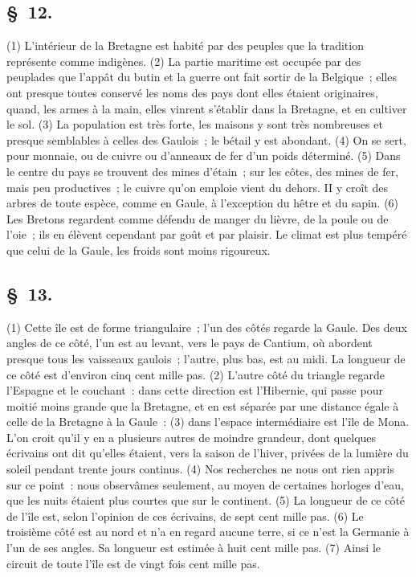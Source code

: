 \documentclass[french,twoside]{book} %
\begin{document}
\subsection[{§ 12.}]{ \textsc{§ 12.} }
\noindent (1) L'intérieur de la Bretagne est habité par des peuples que la tradition représente comme indigènes. (2) La partie maritime est occupée par des peuplades que l’appât du butin et la guerre ont fait sortir de la Belgique ; elles ont presque toutes conservé les noms des pays dont elles étaient originaires, quand, les armes à la main, elles vinrent s’établir dans la Bretagne, et en cultiver le sol. (3) La population est très forte, les maisons y sont très nombreuses et presque semblables à celles des Gaulois ; le bétail y est abondant. (4) On se sert, pour monnaie, ou de cuivre ou d’anneaux de fer d’un poids déterminé. (5) Dans le centre du pays se trouvent des mines d’étain ; sur les côtes, des mines de fer, mais peu productives ; le cuivre qu’on emploie vient du dehors. II y croît des arbres de toute espèce, comme en Gaule, à l’exception du hêtre et du sapin. (6) Les Bretons regardent comme défendu de manger du lièvre, de la poule ou de l’oie ; ils en élèvent cependant par goût et par plaisir. Le climat est plus tempéré que celui de la Gaule, les froids sont moins rigoureux.
\subsection[{§ 13.}]{ \textsc{§ 13.} }
\noindent (1) Cette île est de forme triangulaire ; l’un des côtés regarde la Gaule. Des deux angles de ce côté, l’un est au levant, vers le pays de Cantium, où abordent presque tous les vaisseaux gaulois ; l’autre, plus bas, est au midi. La longueur de ce côté est d’environ cinq cent mille pas. (2) L'autre côté du triangle regarde l’Espagne et le couchant : dans cette direction est l’Hibernie, qui passe pour moitié moins grande que la Bretagne, et en est séparée par une distance égale à celle de la Bretagne à la Gaule : (3) dans l’espace intermédiaire est l’île de Mona. L'on croit qu’il y en a plusieurs autres de moindre grandeur, dont quelques écrivains ont dit qu’elles étaient, vers la saison de l’hiver, privées de la lumière du soleil pendant trente jours continus. (4) Nos recherches ne nous ont rien appris sur ce point : nous observâmes seulement, au moyen de certaines horloges d’eau, que les nuits étaient plus courtes que sur le continent. (5) La longueur de ce côté de l’île est, selon l’opinion de ces écrivains, de sept cent mille pas. (6) Le troisième côté est au nord et n’a en regard aucune terre, si ce n’est la Germanie à l’un de ses angles. Sa longueur est estimée à huit cent mille pas. (7) Ainsi le circuit de toute l’île est de vingt fois cent mille pas.
\end{document}
